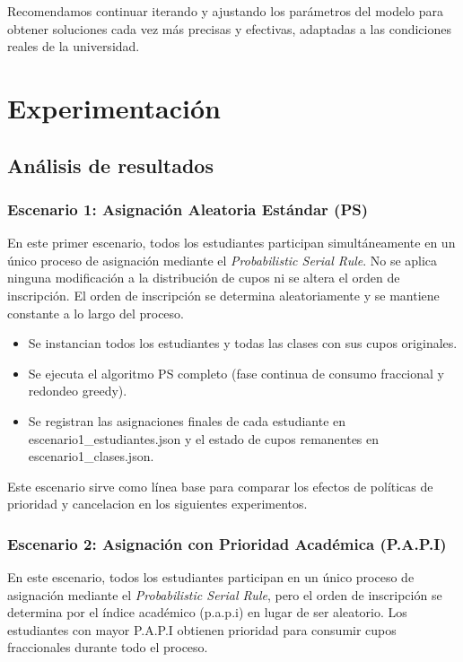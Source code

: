 \documentclass{article}
\begin{document}
Recomendamos continuar iterando y ajustando los parámetros del modelo para obtener soluciones 
cada vez más precisas y efectivas, adaptadas a las condiciones reales de la universidad.



\section{Experimentación}\label{sec:exp}

\subsection{Análisis de resultados}

\subsubsection{Escenario 1: Asignación Aleatoria Estándar (PS)}
En este primer escenario, todos los estudiantes participan simultáneamente en un único
 proceso de asignación mediante el \emph{Probabilistic Serial Rule}. No se aplica 
 ninguna modificación a la distribución de cupos ni se altera el orden de inscripción.
 El orden de inscripción se determina aleatoriamente y se mantiene constante a lo largo
  del proceso.

\begin{itemize}
\item Se instancian todos los estudiantes y todas las clases con sus cupos originales.
\item Se ejecuta el algoritmo PS completo (fase continua de consumo fraccional y 
redondeo greedy).
\item Se registran las asignaciones finales de cada estudiante en escenario1\_estudiantes.json y 
 el estado de cupos remanentes en escenario1\_clases.json.
\end{itemize}

Este escenario sirve como línea base para comparar los efectos de políticas de prioridad
 y cancelacion en los siguientes experimentos.

 \subsubsection{Escenario 2: Asignación con Prioridad Académica (P.A.P.I)}
 En este escenario, todos los estudiantes participan en un único proceso de asignación mediante el
  \emph{Probabilistic Serial Rule}, pero el orden de inscripción se determina por el índice académico 
  (p.a.p.i) en lugar de ser aleatorio. Los estudiantes con mayor P.A.P.I obtienen prioridad para 
  consumir cupos fraccionales durante todo el proceso.
 
\end{document}
